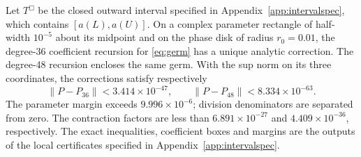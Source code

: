\begin{certificate}\label{cert:local}
Let \(T^\Box\) be the closed outward interval specified in
Appendix~\ref{app:intervalspec}, which contains \([a(L),a(U)]\).
On a complex parameter rectangle of half-width \(10^{-5}\) about its
midpoint and on the phase disk of radius \(r_0=0.01\), the degree-36
coefficient recursion for \eqref{eq:germ} has a unique analytic correction.
The degree-48 recursion encloses the same germ. With the sup norm on its
three coordinates, the corrections satisfy respectively
\[
 \|P-P_{36}\|<3.414\times10^{-47},\qquad
 \|P-P_{48}\|<8.334\times10^{-63}.
\]
The parameter margin exceeds \(9.996\times10^{-6}\); division denominators
are separated from zero. The contraction factors are less than
\(6.891\times10^{-27}\) and \(4.409\times10^{-36}\), respectively.
The exact inequalities, coefficient boxes and margins are the outputs of
the local certificates specified in Appendix~\ref{app:intervalspec}.
\end{certificate}
